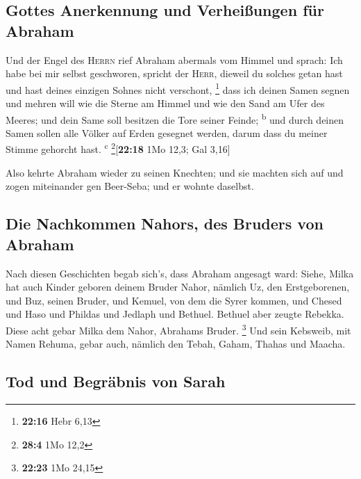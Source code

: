 \hypertarget{gottes-anerkennung-und-verheiuxdfungen-fuxfcr-abraham}{%
\subsection{Gottes Anerkennung und Verheißungen für
Abraham}\label{gottes-anerkennung-und-verheiuxdfungen-fuxfcr-abraham}}

 Und der Engel des \textsc{Herrn} rief Abraham abermals
vom Himmel  und sprach: Ich habe bei mir selbst
geschworen, spricht der \textsc{Herr}, dieweil du solches getan hast und
hast deines einzigen Sohnes nicht verschont, \footnote{\textbf{22:16}
  Hebr 6,13}  dass ich deinen Samen segnen und mehren
will wie die Sterne am Himmel und wie den Sand am Ufer des Meeres; und
dein Same soll besitzen die Tore seiner Feinde; \textsuperscript{b}
 und durch deinen Samen sollen alle Völker auf Erden
gesegnet werden, darum dass du meiner Stimme gehorcht hast.
\textsuperscript{c} \footnote{\textbf{28:4} 1Mo 12,2}{[}\textbf{22:18}
1Mo 12,3; Gal 3,16{]}

 Also kehrte Abraham wieder zu seinen Knechten; und sie
machten sich auf und zogen miteinander gen Beer-Seba; und er wohnte
daselbst.

\hypertarget{die-nachkommen-nahors-des-bruders-von-abraham}{%
\subsection{Die Nachkommen Nahors, des Bruders von
Abraham}\label{die-nachkommen-nahors-des-bruders-von-abraham}}

 Nach diesen Geschichten begab sich's, dass Abraham
angesagt ward: Siehe, Milka hat auch Kinder geboren deinem Bruder Nahor,
 nämlich Uz, den Erstgeborenen, und Buz, seinen Bruder,
und Kemuel, von dem die Syrer kommen,  und Chesed und
Haso und Phildas und Jedlaph und Bethuel.  Bethuel aber
zeugte Rebekka. Diese acht gebar Milka dem Nahor, Abrahams Bruder.
\footnote{\textbf{22:23} 1Mo 24,15}  Und sein Kebsweib,
mit Namen Rehuma, gebar auch, nämlich den Tebah, Gaham, Thahas und
Maacha.

\hypertarget{tod-und-begruxe4bnis-von-sarah}{%
\subsection{Tod und Begräbnis von
Sarah}\label{tod-und-begruxe4bnis-von-sarah}}


